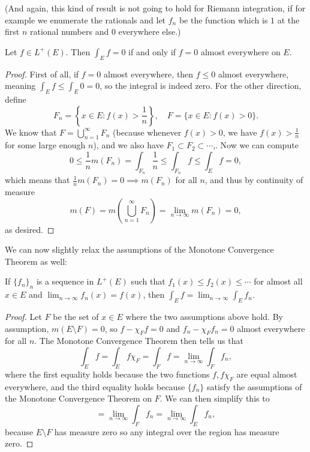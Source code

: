 (And again, this kind of result is not going to hold for Riemann integration, if for example we enumerate the rationals and let $f_n$ be the function which is $1$ at the first $n$ rational numbers and $0$ everywhere else.)

\begin{theorem}
Let $f \in L^+(E)$. Then $\int_E f = 0$ if and only if $f = 0$ almost everywhere on $E$.
\end{theorem}
\begin{proof}
First of all, if $f = 0$ almost everywhere, then $f \le 0$ almost everywhere, meaning $\int_E f \le \int_E 0 = 0$, so the integral is indeed zero. For the other direction, define 
\[
    F_n = \left\{x \in E: f(x) > \frac{1}{n}\right\}, \quad F = \{x \in E: f(x) > 0\}.
\]
We know that $F = \bigcup_{n=1}^{\infty} F_n$ (because whenever $f(x) > 0$, we have $f(x) > \frac{1}{n}$ for some large enough $n$), and we also have $F_1 \subset F_2 \subset \cdots$,. Now we can compute
\[
    0 \le \frac{1}{n} m (F_n) = \int_{F_n} \frac{1}{n} \le \int_{F_n} f \le \int_E f = 0,
\]
which means that $\frac{1}{n} m(F_n) = 0 \implies m(F_n)$ for all $n$, and thus by continuity of measure 
\[
    m(F) = m\left(\bigcup_{n=1}^{\infty} F_n\right) = \lim_{n \to \infty} m(F_n) = 0,
\]
as desired.
\end{proof}

We can now slightly relax the assumptions of the Monotone Convergence Theorem as well:

\begin{theorem}
If $\{f_n\}_n$ is a sequence in $L^+(E)$ such that $f_1(x) \le f_2(x) \le \cdots$ for almost all $x \in E$ and $\lim_{n \to \infty} f_n(x) = f(x)$, then $\int_E f = \lim_{n \to \infty} \int_E f_n$. 
\end{theorem}
\begin{proof}
Let $F$ be the set of $x \in E$ where the two assumptions above hold. By assumption, $m(E \setminus F) = 0$, so $f - \chi_F f = 0$ and $f_n - \chi_F f_n = 0$ almost everywhere for all $n$. The Monotone Convergence Theorem then tells us that 
\[
    \int_E f = \int_E f \chi_F = \int_F f = \lim_{n \to \infty} \int_F f_n,
\]
where the first equality holds because the two functions $f, f\chi_F$ are equal almost everywhere, and the third equality holds because $\{f_n\}$ satisfy the assumptions of the Monotone Convergence Theorem on $F$. We can then simplify this to 
\[
    = \lim_{n \to \infty} \int_F f_n = \lim_{n \to \infty} \int_E f_n,
\]
because $E \setminus F$ has measure zero so any integral over the region has measure zero.
\end{proof}

